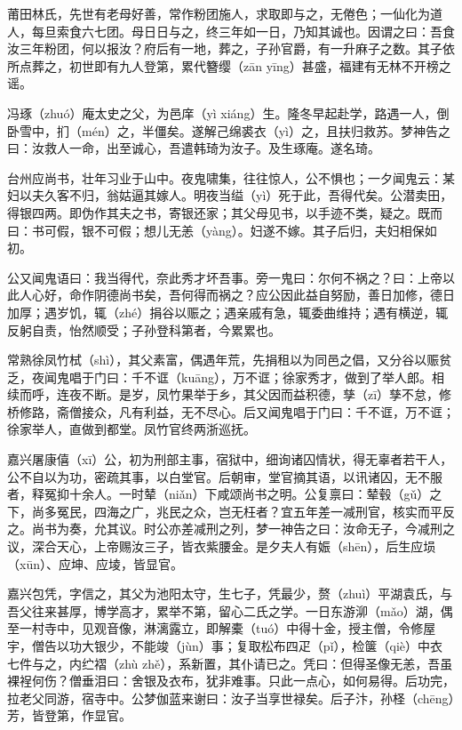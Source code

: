 \documentclass[12pt,UTF8]{ctexbook}
\begin{document}
莆田林氏，先世有老母好善，常作粉团施人，求取即与之，无倦色；一仙化为道人，每旦索食六七团。母日日与之，终三年如一日，乃知其诚也。因谓之曰：吾食汝三年粉团，何以报汝？府后有一地，葬之，子孙官爵，有一升麻子之数。其子依所点葬之，初世即有九人登第，累代簪缨（zān  yīng）甚盛，福建有无林不开榜之谣。

冯琢（zhuó）庵太史之父，为邑庠（yì  xiáng）生。隆冬早起赴学，路遇一人，倒卧雪中，扪（mén）之，半僵矣。遂解己绵裘衣（yì）之，且扶归救苏。梦神告之曰：汝救人一命，出至诚心，吾遣韩琦为汝子。及生琢庵。遂名琦。

台州应尚书，壮年习业于山中。夜鬼啸集，往往惊人，公不惧也；一夕闻鬼云：某妇以夫久客不归，翁姑逼其嫁人。明夜当缢（yì）死于此，吾得代矣。公潜卖田，得银四两。即伪作其夫之书，寄银还家；其父母见书，以手迹不类，疑之。既而曰：书可假，银不可假；想儿无恙（yàng）。妇遂不嫁。其子后归，夫妇相保如初。

公又闻鬼语曰：我当得代，奈此秀才坏吾事。旁一鬼曰：尔何不祸之？曰：上帝以此人心好，命作阴德尚书矣，吾何得而祸之？应公因此益自努励，善日加修，德日加厚；遇岁饥，辄（zhé）捐谷以赈之；遇亲戚有急，辄委曲维持；遇有横逆，辄反躬自责，怡然顺受；子孙登科第者，今累累也。

常熟徐凤竹栻（shì），其父素富，偶遇年荒，先捐租以为同邑之倡，又分谷以赈贫乏，夜闻鬼唱于门曰：千不诓（kuāng），万不诓；徐家秀才，做到了举人郎。相续而呼，连夜不断。是岁，凤竹果举于乡，其父因而益积德，孳（zī）孳不怠，修桥修路，斋僧接众，凡有利益，无不尽心。后又闻鬼唱于门曰：千不诓，万不诓；徐家举人，直做到都堂。凤竹官终两浙巡抚。

嘉兴屠康僖（xī）公，初为刑部主事，宿狱中，细询诸囚情状，得无辜者若干人，公不自以为功，密疏其事，以白堂官。后朝审，堂官摘其语，以讯诸囚，无不服者，释冤抑十余人。一时辇（niǎn）下咸颂尚书之明。公复禀曰：辇毂（gǔ）之下，尚多冤民，四海之广，兆民之众，岂无枉者？宜五年差一减刑官，核实而平反之。尚书为奏，允其议。时公亦差减刑之列，梦一神告之曰：汝命无子，今减刑之议，深合天心，上帝赐汝三子，皆衣紫腰金。是夕夫人有娠（shēn），后生应埙（xūn）、应坤、应堎，皆显官。

嘉兴包凭，字信之，其父为池阳太守，生七子，凭最少，赘（zhuì）平湖袁氏，与吾父往来甚厚，博学高才，累举不第，留心二氏之学。一日东游泖（mǎo）湖，偶至一村寺中，见观音像，淋漓露立，即解橐（tuó）中得十金，授主僧，令修屋宇，僧告以功大银少，不能竣（jùn）事；复取松布四疋（pǐ），检箧（qiè）中衣七件与之，内纻褶（zhù  zhě），系新置，其仆请已之。凭曰：但得圣像无恙，吾虽裸裎何伤？僧垂泪曰：舍银及衣布，犹非难事。只此一点心，如何易得。后功完，拉老父同游，宿寺中。公梦伽蓝来谢曰：汝子当享世禄矣。后子汴，孙柽（chēng）芳，皆登第，作显官。
\end{document}
